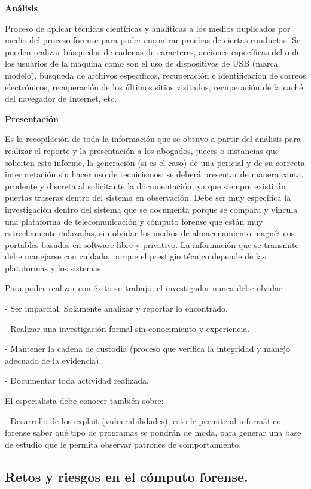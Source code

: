 \textbf{Análisis}

Proceso de aplicar técnicas científicas y analíticas a los medios duplicados por medio del proceso forense para poder encontrar pruebas de ciertas conductas. Se pueden realizar búsquedas de cadenas de caracteres, acciones específicas del o de los usuarios de la máquina como son el uso de dispositivos de USB (marca, modelo), búsqueda de archivos específicos, recuperación e identificación de correos electrónicos, recuperación de los últimos sitios visitados, recuperación de la caché del navegador de Internet, etc.

\textbf{Presentación}

Es la recopilación de toda la información que se obtuvo a partir del análisis para realizar el reporte y la presentación a los abogados, jueces o instancias que soliciten este informe, la generación (si es el caso) de una pericial y de su correcta interpretación sin hacer uso de tecnicismos; se deberá presentar de manera cauta, prudente y discreta al solicitante la documentación, ya que siempre existirán puertas traseras dentro del sistema en observación. Debe ser muy específica la investigación dentro del sistema que se documenta porque se compara y vincula una plataforma de telecomunicación y cómputo forense que están muy estrechamente enlazadas, sin olvidar los medios de almacenamiento magnéticos portables basados en software libre y privativo. La información que se transmite debe manejarse con cuidado, porque el prestigio técnico depende de las plataformas y los sistemas

Para poder realizar con éxito su trabajo, el investigador nunca debe olvidar:

- Ser imparcial. Solamente analizar y reportar lo encontrado.

- Realizar una investigación formal sin conocimiento y experiencia.

- Mantener la cadena de custodia (proceso que verifica la integridad y manejo adecuado de la evidencia).

- Documentar toda actividad realizada.

El especialista debe conocer también sobre:

- Desarrollo de los exploit (vulnerabilidades), esto le permite al informático forense saber qué tipo de programas se pondrán de moda, para generar una base de estudio que le permita observar patrones de comportamiento.


\subsection{Retos y riesgos en el cómputo forense.}

